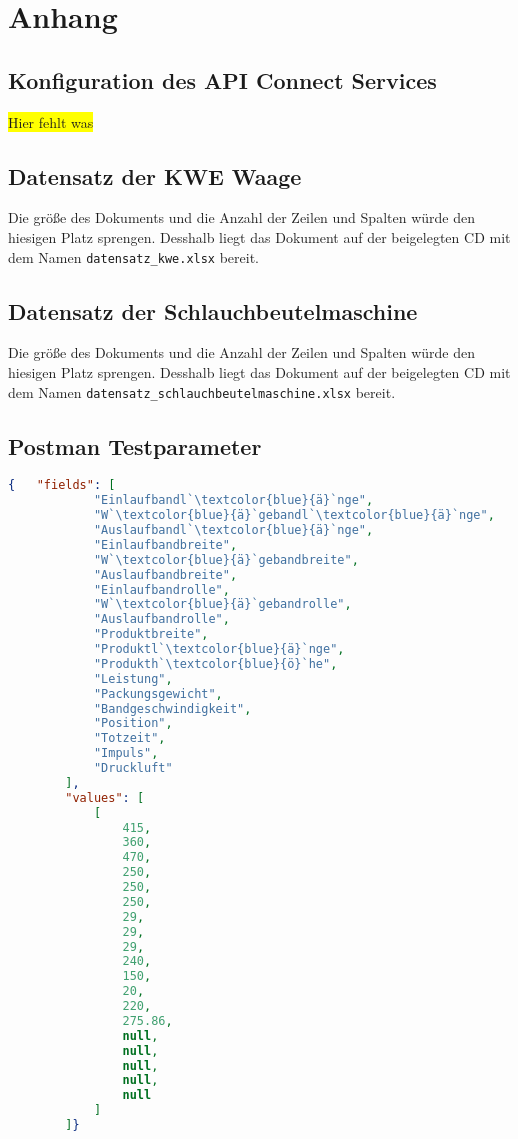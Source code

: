 \chapter{Anhang}
\label{ch:anhang}

\section{Konfiguration des API Connect Services}
\label{sec:konfigurationAPIConnect}
\colorbox{yellow}{Hier fehlt was}

\section{Datensatz der KWE Waage}
\label{sec:scaleData}
Die größe des Dokuments und die Anzahl der Zeilen und Spalten würde den hiesigen Platz sprengen. Desshalb liegt das
Dokument auf der beigelegten CD mit dem Namen \texttt{datensatz\_kwe.xlsx} bereit.

\section{Datensatz der Schlauchbeutelmaschine}
\label{sec:schlauchbeutelmaschine}
Die größe des Dokuments und die Anzahl der Zeilen und Spalten würde den hiesigen Platz sprengen. Desshalb liegt das
Dokument auf der beigelegten CD mit dem Namen \texttt{datensatz\_schlauchbeutelmaschine.xlsx} bereit.

\newpage

\section{Postman Testparameter}
\label{sec:postmanTestparameter}

\begin{lstlisting}[language=JSON, caption=Testparameter für Postman, label=ls:anhang_postman, escapeinside=``]
    {   "fields": [
            "Einlaufbandl`\textcolor{blue}{ä}`nge",
            "W`\textcolor{blue}{ä}`gebandl`\textcolor{blue}{ä}`nge",
            "Auslaufbandl`\textcolor{blue}{ä}`nge",
            "Einlaufbandbreite",
            "W`\textcolor{blue}{ä}`gebandbreite",
            "Auslaufbandbreite",
            "Einlaufbandrolle",
            "W`\textcolor{blue}{ä}`gebandrolle",
            "Auslaufbandrolle",
            "Produktbreite",
            "Produktl`\textcolor{blue}{ä}`nge",
            "Produkth`\textcolor{blue}{ö}`he",
            "Leistung",
            "Packungsgewicht",
            "Bandgeschwindigkeit",
            "Position",
            "Totzeit",
            "Impuls",
            "Druckluft"
        ],
        "values": [
            [
                415,
                360,
                470,
                250,
                250,
                250,
                29,
                29,
                29,
                240,
                150,
                20,
                220,
                275.86,
                null,
                null,
                null,
                null,
                null
            ]
        ]}
\end{lstlisting}

